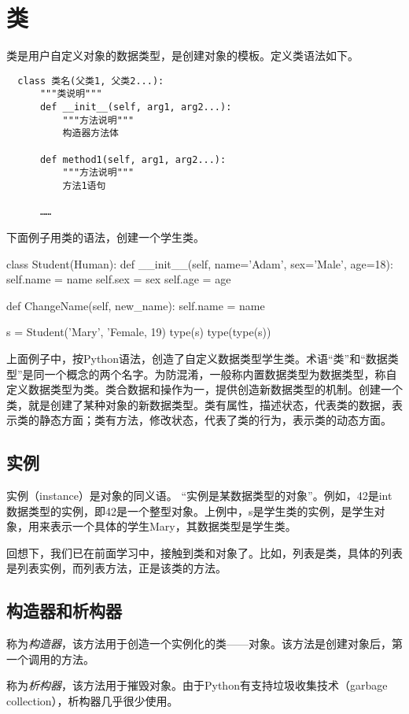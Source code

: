 \section{类}
类是用户自定义对象的数据类型，是创建对象的模板。定义类语法如下。
\begin{framed}
\begin{verbatim}
  class 类名(父类1, 父类2...):
      """类说明"""
      def __init__(self, arg1, arg2...):
          """方法说明"""
          构造器方法体

      def method1(self, arg1, arg2...):
          """方法说明"""
          方法1语句

      ……
\end{verbatim}
\end{framed}
下面例子用类的语法，创建一个学生类。
\begin{python}
class Student(Human): 
    def __init__(self, name='Adam', sex='Male', age=18):
        self.name = name
        self.sex = sex
        self.age = age

    def ChangeName(self, new_name):
        self.name = name
         
s = Student('Mary', 'Female, 19)
type(s)
type(type(s))
\end{python}
上面例子中，按Python语法，创造了自定义数据类型学生类。术语“类”和“数据类型”是同一个概念的两个名字。为防混淆，一般称内置数据类型为数据类型，称自定义数据类型为类。类合数据和操作为一，提供创造新数据类型的机制。创建一个类，就是创建了某种对象的新数据类型。类有属性，描述状态，代表类的数据，表示类的静态方面；类有方法，修改状态，代表了类的行为，表示类的动态方面。
\subsection{实例}
实例（instance）是对象的同义语。 “实例是某数据类型的对象”。例如，42是int数据类型的实例，即42是一个整型对象。上例中，s是学生类的实例，是学生对象，用来表示一个具体的学生Mary，其数据类型是学生类。

回想下，我们已在前面学习中，接触到类和对象了。比如，列表是类，具体的列表是列表实例，而列表方法，正是该类的方法。
\subsection{构造器和析构器}
称为\emph{构造器}，该方法用于创造一个实例化的类——对象。该方法是创建对象后，第一个调用的方法。

称为\emph{析构器}，该方法用于摧毁对象。由于Python有支持垃圾收集技术（garbage collection），析构器几乎很少使用。
